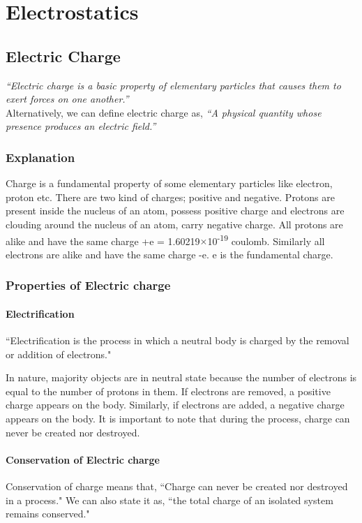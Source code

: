 \chapter{Electrostatics}
\label{11}
\section{Electric Charge}
\textit{``Electric charge is a basic property of elementary particles that causes them to exert forces on one another.”}\\
\indent Alternatively, we can define electric charge as, \textit{“A physical quantity whose presence produces an electric field.”}
\subsection*{Explanation}
Charge is a fundamental property of some elementary particles like 
electron, proton etc. There are two kind of charges; positive and 
negative. Protons are present inside the nucleus of an atom, possess 
positive charge and electrons are clouding around the nucleus of an 
atom, carry negative charge. All protons are alike and have the same 
charge +e = 1.60219$\times$10\textsuperscript{-19} coulomb. Similarly all electrons are alike 
and have the same charge -e. e is the fundamental charge.
\subsection{Properties of Electric charge}
\subsubsection{Electrification}
``Electrification is the process in which a neutral body is 
charged by the removal or addition of electrons."

In nature, majority objects are in neutral state because the number of electrons 
is equal to the number of protons in them. If electrons are removed, a positive charge appears on the body. Similarly, if electrons are added, a negative charge 
appears on the body. It is important to note that during 
the process, charge can never be created nor destroyed.
\subsubsection{Conservation of Electric charge}
Conservation of charge means that, ``Charge can never be created nor destroyed in a process." We can 
also state it as, ``the total charge of an isolated system remains conserved."
